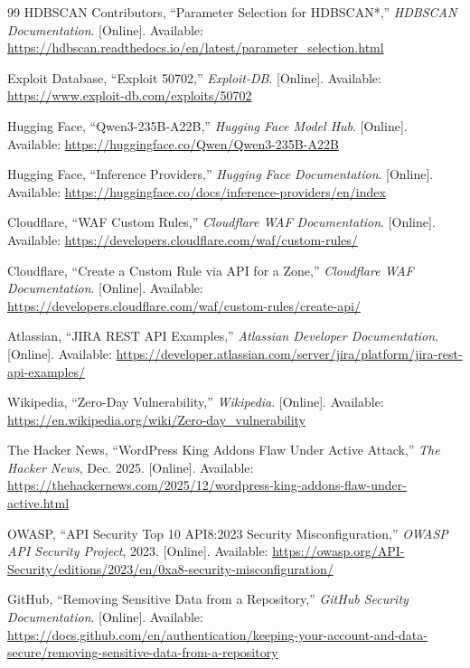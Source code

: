 \documentclass[12pt, a4paper]{report}   %
\begin{document}
\begin{thebibliography}{99}
HDBSCAN Contributors, ``Parameter Selection for HDBSCAN*,'' \textit{HDBSCAN
Documentation}. [Online]. Available:
\url{https://hdbscan.readthedocs.io/en/latest/parameter_selection.html}

Exploit Database, ``Exploit 50702,'' \textit{Exploit-DB}. [Online]. Available:
\url{https://www.exploit-db.com/exploits/50702}

Hugging Face, ``Qwen3-235B-A22B,'' \textit{Hugging Face Model Hub}. [Online].
Available: \url{https://huggingface.co/Qwen/Qwen3-235B-A22B}

Hugging Face, ``Inference Providers,'' \textit{Hugging Face Documentation}.
[Online]. Available: \url{https://huggingface.co/docs/inference-providers/en/index}

Cloudflare, ``WAF Custom Rules,'' \textit{Cloudflare WAF Documentation}. 
[Online]. Available:
\url{https://developers.cloudflare.com/waf/custom-rules/}

Cloudflare, ``Create a Custom Rule via API for a Zone,'' \textit{Cloudflare 
WAF Documentation}. [Online]. Available:
\url{https://developers.cloudflare.com/waf/custom-rules/create-api/}

Atlassian, ``JIRA REST API Examples,'' \textit{Atlassian Developer Documentation}.
[Online]. Available:
\url{https://developer.atlassian.com/server/jira/platform/jira-rest-api-examples/}

Wikipedia, ``Zero-Day Vulnerability,'' \textit{Wikipedia}. [Online]. Available:
\url{https://en.wikipedia.org/wiki/Zero-day_vulnerability}

The Hacker News, ``WordPress King Addons Flaw Under Active Attack,''
\textit{The Hacker News}, Dec. 2025. [Online]. Available:
\url{https://thehackernews.com/2025/12/wordpress-king-addons-flaw-under-active.html}

OWASP, ``API Security Top 10 API8:2023 Security Misconfiguration,''
\textit{OWASP API Security Project}, 2023. [Online]. Available:
\url{https://owasp.org/API-Security/editions/2023/en/0xa8-security-misconfiguration/}

GitHub, ``Removing Sensitive Data from a Repository,'' \textit{GitHub Security
Documentation}. [Online]. Available:
\url{https://docs.github.com/en/authentication/keeping-your-account-and-data-secure/removing-sensitive-data-from-a-repository}


\end{thebibliography}
\end{document}
